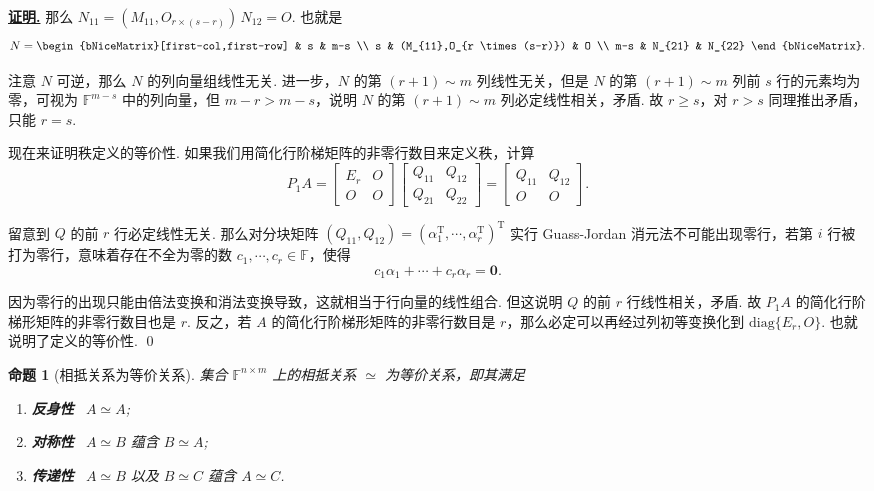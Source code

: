 \documentclass[10pt,openany]{article}
\theoremstyle{thmstyle} %
\theoremstyle{defstyle} %
\theoremstyle{prostyle} %
\newtheorem{proposition}[theorem]{命题}
\theoremstyle{exastyle}
\theoremstyle{remstyle}
\renewenvironment{proof}[1][证明]{\par\underline{\textbf{#1.}} \;\fangsong}{\qed\par}
\newcommand{\T}{^{\text{T}}}
\newcommand{\F}{\mathbb{F}}
\newcommand{\nm}{^{n \times m}}
\newcommand{\diag}{\mathrm{diag}}
\begin{document}
\begin{proof}
	那么 \( N_{11}=(M_{11},O_{r \times (s-r)}) \, N_{12}=O \). 也就是
	\[ N=\begin{bNiceMatrix}[first-col,first-row]
		& s & m-s \\
		s & (M_{11},O_{r \times (s-r)}) & O \\
		m-s & N_{21} & N_{22}
	\end{bNiceMatrix}. \]
	
	注意 \( N \) 可逆，那么 \( N \) 的列向量组线性无关. 进一步，\( N \) 的第 \( (r+1) \sim m \) 列线性无关，但是 \( N \) 的第 \( (r+1) \sim m \) 列前 \( s \) 行的元素均为零，可视为 \( \F^{m-s} \) 中的列向量，但 \( m-r>m-s \)，说明 \( N \) 的第 \( (r+1) \sim m \) 列必定线性相关，矛盾. 故 \( r \geq s \)，对 \( r>s \) 同理推出矛盾，只能 \( r=s \).
	
	现在来证明秩定义的等价性. 如果我们用简化行阶梯矩阵的非零行数目来定义秩，计算
	\[ P_1A=\begin{bmatrix}
		E_r & O \\
		O & O
	\end{bmatrix}\begin{bmatrix}
	Q_{11} & Q_{12} \\
	Q_{21} & Q_{22}
	\end{bmatrix}=\begin{bmatrix}
	Q_{11} & Q_{12} \\
	O & O
	\end{bmatrix}. \]
	
	留意到 \( Q \) 的前 \( r \) 行必定线性无关. 那么对分块矩阵 \( (Q_{11},Q_{12})=(\alpha_1\T,\cdots,\alpha_r\T)\T \) 实行 Guass-Jordan 消元法不可能出现零行，若第 \( i \) 行被打为零行，意味着存在不全为零的数 \( c_1,\cdots,c_r \in \F \)，使得
	\[ c_1\alpha_1+\cdots+c_r\alpha_r=\bm{0}. \]
	
	因为零行的出现只能由倍法变换和消法变换导致，这就相当于行向量的线性组合. 但这说明 \( Q \) 的前 \( r \) 行线性相关，矛盾. 故 \( P_1A \) 的简化行阶梯形矩阵的非零行数目也是 \( r \). 反之，若 \( A \) 的简化行阶梯形矩阵的非零行数目是 \( r \)，那么必定可以再经过列初等变换化到 \( \diag\{E_r,O \} \).  也就说明了定义的等价性.
\end{proof}

\begin{proposition}[相抵关系为等价关系] \label{3.1.4}
	集合 \( \F\nm \) 上的相抵关系 \( \simeq \) 为等价关系，即其满足
	\begin{enumerate}[(1)]
		\item \textbf{反身性} \ \( A \simeq A \);
		\item \textbf{对称性} \ \( A \simeq B \) 蕴含 \( B \simeq A \);
		\item \textbf{传递性} \ \( A \simeq B \) 以及 \( B \simeq C \) 蕴含 \( A \simeq C \).
	\end{enumerate} 
\end{proposition}
\end{document}

